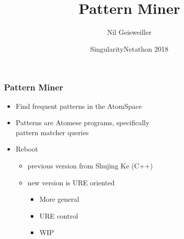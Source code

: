 \documentclass{beamer}
\title{Pattern Miner}
\author{Nil Geisweiller}
\institute[OpenCog Foundation] %
{
  OpenCog Foundation
}
\date[SingularityNetathon 2018] %
{SingularityNetathon 2018}
\begin{document}
\frame
{
  \maketitle
}


\begin{frame}[fragile]
  \frametitle{Pattern Miner}
  \begin{itemize}
  \item Find \alert{frequent patterns} in the AtomSpace
  \item Patterns are \alert{Atomese} programs, specifically\\
    \alert{pattern matcher} queries
  \item Reboot
    \begin{itemize}
    \item previous version from Shujing Ke (C++)
    \item new version is \alert{URE} oriented
      \begin{itemize}
      \item More general
      \item URE control
      \item WIP
      \end{itemize}
    \end{itemize}
  \end{itemize}
\end{frame}
\end{document}
